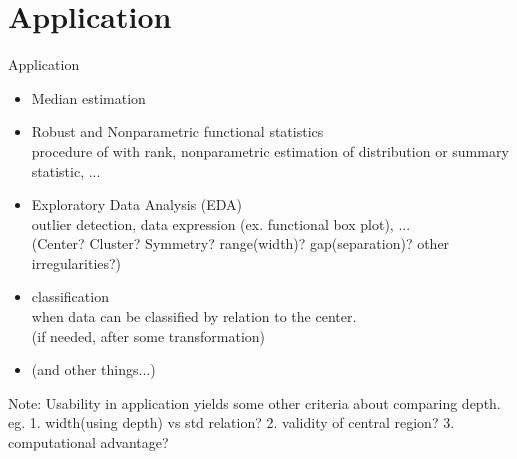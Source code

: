 \documentclass[aspectratio=169,ignorenonframetext,9pt]{beamer}
\theoremstyle{plain}
\theoremstyle{definition}
\begin{document}
\section{Application}
\begin{frame}{Application}
\begin{itemize}
    \item Median estimation
    \item Robust and Nonparametric functional statistics \\
    procedure of with rank, nonparametric estimation of distribution or summary statistic, ...
    \item Exploratory Data Analysis (EDA) \\
    outlier detection, data expression (ex. functional box plot), ...\\
    (Center? Cluster? Symmetry? range(width)? gap(separation)? other irregularities?)
    \item classification \\
    when data can be classified by relation to the center. \\
    (if needed, after some transformation)
    \item (and other things...)
\end{itemize}

Note: Usability in application yields some other criteria about comparing depth.\\
eg. 1. width(using depth) vs std relation? 2. validity of central region? 3. computational advantage?


\end{frame}
\end{document}

